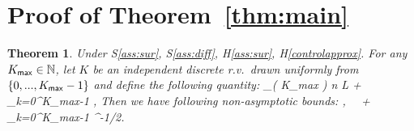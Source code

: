 \documentclass[11pt]{article}
\newtheorem*{Theorem*}{Theorem}
\theoremstyle{t}
\begin{document}
\newpage

\appendix

\section{Proof of Theorem~\ref{thm:main}}
\begin{Theorem*}
Under S\ref{ass:sur}, S\ref{ass:diff}, H\ref{ass:sur}, H\ref{controlapprox}. For any $K_{\sf max} \in \NN$, let $K$ be an independent discrete r.v.~drawn uniformly from $\{0,...,K_{\sf max}-1\}$ and define the following quantity:
\beq \notag
\Delta_{( K_{\sf max} )}  n L  +  \sum_{k=0}^{K_{\sf max}-1}  \eqsp,
\eeq
Then we have following non-asymptotic bounds:
\beq \notag
\EE {} \leq {},~~
\EE[ g_-( \hp{K} ) ] \leq {} +  \sum_{k=0}^{K_{\sf max}-1} ^{-1/2}.
\eeq
\end{Theorem*}
\end{document}
